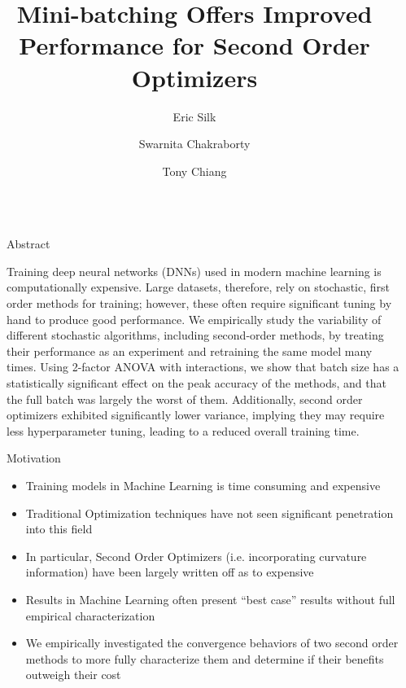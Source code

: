 \documentclass[final]{beamer}
\title{Mini-batching Offers Improved Performance for Second Order Optimizers}
\author{Eric Silk \inst{1} \and Swarnita Chakraborty \inst{2} \and Tony Chiang \inst{3}}
\institute[shortinst]{
  \inst{1} University of Washington/University of Illinois Urbana-Champaign \samelineand
  \inst{2} Washington State University \samelineand
  \inst{3} Pacific Northwest National Laboratory
}
\newlength{\sepwidth}
\newlength{\colwidth}
\newcommand{\separatorcolumn}{\begin{column}{\sepwidth}\end{column}}
\begin{document}
\begin{frame}[t]
  \begin{columns}[t]
    \separatorcolumn

    \begin{column}{\colwidth}

      \begin{block}{Abstract}

        Training deep neural networks (DNNs) used in modern machine learning is computationally
        expensive. Large datasets, therefore, rely on stochastic, first order methods for training;
        however, these often require significant tuning by hand to produce good performance. We
        empirically study the variability of different stochastic algorithms, including second-order
        methods, by treating their performance as an experiment and retraining the same model many
        times. Using 2-factor ANOVA with interactions, we show that batch size has a statistically
        significant effect on the peak accuracy of the methods, and that the full batch was largely
        the worst of them. Additionally, second order optimizers exhibited significantly lower variance,
        implying they may require less hyperparameter tuning, leading to a reduced overall training time.

      \end{block}

      \begin{alertblock}{Motivation}
        \begin{itemize}
          \item Training models in Machine Learning is time consuming and expensive
          \item Traditional Optimization techniques have not seen significant penetration into this field
          \item In particular, Second Order Optimizers (i.e. incorporating curvature information)
                have been largely written off as to expensive
          \item Results in Machine Learning often present ``best case'' results without full
                empirical characterization
          \item We empirically investigated the convergence behaviors of two second order methods to
                more fully characterize them and determine if their benefits outweigh their cost
        \end{itemize}

      \end{alertblock}


\end{column}
\end{columns}
\end{frame}
\end{document}
